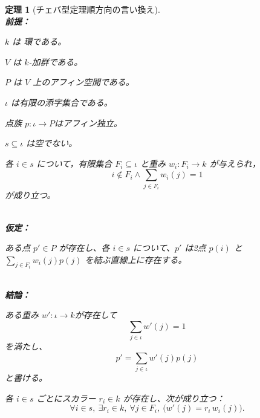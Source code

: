 \documentclass[a4paper,12pt]{bxjsbook}
\theoremstyle{theorem}
\newtheorem{theorem}{定理}[chapter]
\begin{document}
    \begin{theorem}[チェバ型定理順方向の言い換え]
        \noindent\textbf{\\前提：}\par
        \begin{theoremenumerate}[label=(P\arabic*), leftmargin=4em, topsep=2pt, partopsep=0pt, itemsep=0pt, parsep=0pt]
            \item $k$ は 環である。
            \item $V$ は $k$-加群である。
            \item $P$ は $V$ 上のアフィン空間である。
            \item $\iota$ は有限の添字集合である。
            \item 点族 $p : \iota \to P$はアフィン独立。
            \item $s \subseteq \iota$ は空でない。
            \item 各 $i\in s$ について，有限集合 $F_i\subseteq \iota$ と重み $w_i:F_i\to k$ が与えられ，
            \[
            i\notin F_i \land \sum_{j\in F_i} w_i(j)=1
            \]
            が成り立つ。
        \end{theoremenumerate}
        \noindent\textbf{\\仮定：}\par
        \begin{theoremenumerate}[label=(A\arabic*), leftmargin=4em, topsep=2pt, partopsep=0pt, itemsep=0pt, parsep=0pt]
            \item ある点 $p'\in P$ が存在し、各 $i \in s$ について、$p'$ は2点 $p(i)$ と $\sum_{j \in F_i} w_i(j)p(j)$ を結ぶ直線上に存在する。
        \end{theoremenumerate}

        \noindent\textbf{\\結論：}\par
        \begin{theoremenumerate}[label=(C\arabic*), leftmargin=4em, topsep=2pt, partopsep=0pt, itemsep=0pt, parsep=0pt]
            \item ある重み $w' : \iota \to k$が存在して
            \[
            \sum_{j \in \iota} w'(j) = 1
            \]
            を満たし、
            \[
            p' = \sum_{j \in \iota} w'(j)p(j)
            \]
            と書ける。
            \item 各 $i \in s$ ごとにスカラー $r_i \in k$ が存在し、次が成り立つ： 
            \[
            \forall i \in s,\ \exists r_i \in k,\ \forall j \in F_i,\ \bigl(w'(j) = r_i\, w_i(j)\bigr).
            \]
        \end{theoremenumerate}
    \end{theorem}
\end{document}
